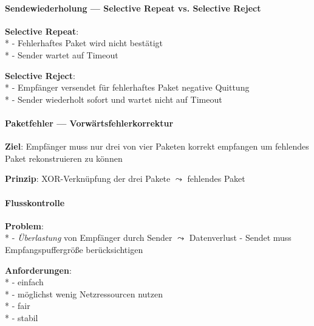 \paragraph{Sendewiederholung --- Selective Repeat vs. Selective Reject}
\begin{items}
  \item \textbf{Selective Repeat}: \\*
    - Fehlerhaftes Paket wird nicht bestätigt \\*
    - Sender wartet auf Timeout
  \item \textbf{Selective Reject}: \\*
    - Empfänger versendet für fehlerhaftes Paket negative Quittung \\*
    - Sender wiederholt sofort und wartet nicht auf Timeout
\end{items}

\paragraph{Paketfehler --- Vorwärtsfehlerkorrektur}
\begin{items}
  \item \textbf{Ziel}: Empfänger muss nur drei von vier Paketen korrekt empfangen um fehlendes Paket rekonstruieren zu können
  \item \textbf{Prinzip}: XOR-Verknüpfung der drei Pakete \( \leadsto \) fehlendes Paket
\end{items}

\paragraph{Flusskontrolle}
\begin{items}
  \item \textbf{Problem}: \\*
    - \emph{Überlastung} von Empfänger durch Sender \( \leadsto \) Datenverlust
    - Sendet muss Empfangspuffergröße berücksichtigen
  \item \textbf{Anforderungen}: \\*
    - einfach \\*
    - möglichst wenig Netzressourcen nutzen \\*
    - fair \\*
    - stabil
\end{items}


